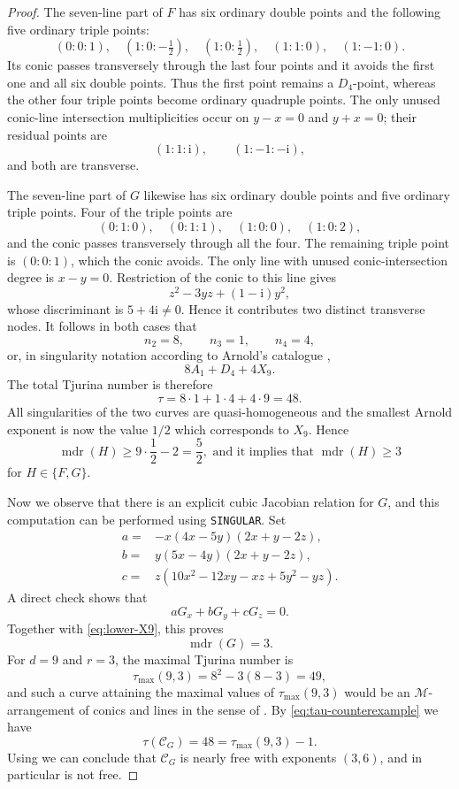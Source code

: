 \documentclass[10pt,a4paper]{amsart}
\newcommand{\mdr}{\operatorname{mdr}}
\newcommand{\ii}{\mathrm i}
\begin{document}
\begin{proof}
The seven-line part of $F$ has six ordinary double points and the following five ordinary triple points:
\[
 (0:0:1),\quad
 (1:0:-\tfrac12),\quad
 (1:0:\tfrac12),\quad
 (1:1:0),\quad
 (1:-1:0).
\]
Its conic passes transversely through the last four points and it avoids the first one and all six double points. Thus the first point remains a
$D_4$-point, whereas the other four triple points become ordinary quadruple
points.  The only unused conic-line intersection multiplicities occur on
$y-x=0$ and $y+x=0$; their residual points are
\[
 (1:1:\ii),\qquad (1:-1:-\ii),
\]
and both are transverse.

The seven-line part of $G$ likewise has six ordinary double points and five ordinary triple points. Four of the triple points are
\[
 (0:1:0),\quad (0:1:1),\quad (1:0:0),\quad (1:0:2),
\]
and the conic passes transversely through all the four. The remaining triple point is $(0:0:1)$, which the conic avoids. The only line with unused conic-intersection degree is $x-y=0$.  Restriction of the conic to this line gives
\[
 z^2-3yz+(1-\ii)y^2,
\]
whose discriminant is $5+4\ii\ne0$.  Hence it contributes two distinct
transverse nodes. It follows in both cases that
\[
 n_2=8,\qquad n_3=1,\qquad n_4=4,
\]
or, in singularity notation according to Arnold's catalogue \cite{arnold},
\[
 8A_1+D_4+4X_9.
\]
The total Tjurina number is therefore
\begin{equation}\label{eq:tau-counterexample}
 \tau=8\cdot1+1\cdot4+4\cdot9=48.
\end{equation}
All singularities of the two curves are quasi-homogeneous and the smallest Arnold exponent is now the value $1/2$ which corresponds to $X_9$. Hence
\begin{equation}\label{eq:lower-X9}
 \mdr(H)\ge 9\cdot\frac12-2=\frac52,
\text{ and it implies that }\mdr(H)\ge3
\end{equation}
for $H \in \{F,G\}$.

Now we observe that there is an explicit cubic Jacobian relation for $G$, and this computation can be performed using \texttt{SINGULAR}. Set
\begin{align*}
 a={}&-x(4x-5y)(2x+y-2z),\\
 b={}& y(5x-4y)(2x+y-2z),\\
 c={}& z(10x^2-12xy-xz+5y^2-yz).
\end{align*}
A direct check shows that
\[
 aG_x+bG_y+cG_z=0.
\]
Together with \eqref{eq:lower-X9}, this proves
\[
 \mdr(G)=3.
\]
For $d=9$ and $r=3$, the maximal Tjurina number is
\[
 \tau_{\max}(9,3)=8^2-3(8-3)=49,
\]
and such a curve attaining the maximal values of $\tau_{\max}(9,3)$ would be an $\mathscr{M}$-arrangement of conics and lines in the sense of \cite{MJ}. By \eqref{eq:tau-counterexample} we have
\[
 \tau(\mathcal C_G)=48=\tau_{\max}(9,3)-1.
\]
Using \cite{DimcaMaxTau} we can conclude that $\mathcal C_G$ is nearly free with exponents $(3,6)$, and in particular is not free.


\end{proof}
\end{document}

